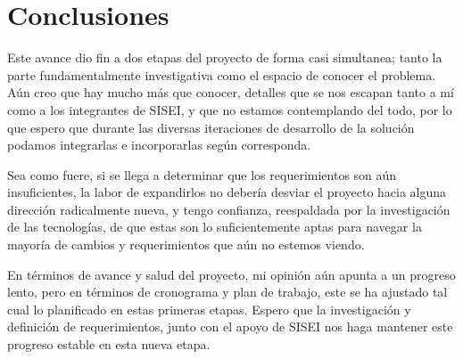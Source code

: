 \section{Conclusiones}

Este avance dio fin a dos etapas del proyecto de forma casi simultanea; tanto la parte fundamentalmente investigativa como el espacio de conocer el problema. Aún creo que hay mucho más que conocer, detalles que se nos escapan tanto a mí como a los integrantes de SISEI, y que no estamos contemplando del todo, por lo que espero que durante las diversas iteraciones de desarrollo de la solución podamos integrarlas e incorporarlas según corresponda.

Sea como fuere, si se llega a determinar que los requerimientos son aún insuficientes, la labor de expandirlos no debería desviar el proyecto hacia alguna dirección radicalmente nueva, y tengo confianza, reespaldada por la investigación de las tecnologías, de que estas son lo suficientemente aptas para navegar la mayoría de cambios y requerimientos que aún no estemos viendo.

En términos de avance y salud del proyecto, mi opinión aún apunta a un progreso lento, pero en términos de cronograma y plan de trabajo, este se ha ajustado tal cual lo planificado en estas primeras etapas. Espero que la investigación y definición de requerimientos, junto con el apoyo de SISEI nos haga mantener este progreso estable en esta nueva etapa.

\clearpage

